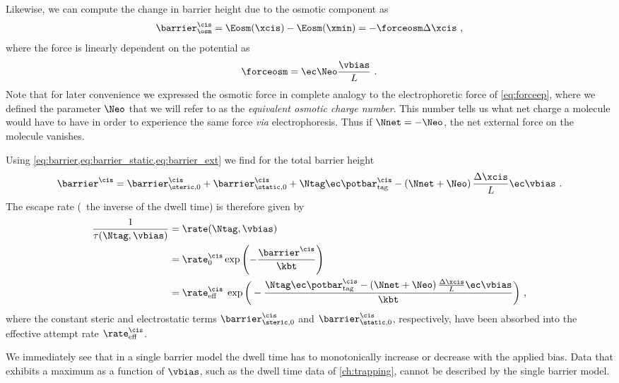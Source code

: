 Likewise, we can compute the change in barrier height due to the osmotic component as
%
\begin{align*}
    \barrier^\cis_{\osm} = \Eosm(\xcis) - \Eosm(\xmin)
    = - \forceosm \Delta \xcis
    \text{ ,}
\end{align*}
%
where the force is linearly dependent on the potential as
%
\begin{align}\label{eq:osmoticforce}
    \forceosm = \ec \Neo \frac{\vbias}{L}
    \text{ .}
\end{align}
%
Note that for later convenience we expressed the osmotic force in complete analogy to the electrophoretic
force of \cref{eq:forceep}, where we defined the parameter $\Neo$ that we will refer to as the
\emph{equivalent osmotic charge number}. This number tells us what net charge a molecule would have to have in
order to experience the same force \textit{via} electrophoresis. Thus if $\Nnet = -\Neo$, the net external
force on the molecule vanishes.

Using \cref{eq:barrier,eq:barrier_static,eq:barrier_ext} we find for the total barrier height
%
\begin{align}\label{eq:cisbarrier}
    \barrier^\cis = \barrier^{\cis}_{\steric,0} + \barrier^{\cis}_{\static,0}
        + \Ntag \ec  \potbar_{\rm{tag}}^\cis
        - \left(\Nnet + \Neo\right) \frac{\Delta \xcis}{L}\ec \vbias
    \text{ .}
\end{align}
%
The escape rate (\ie~the inverse of the dwell time) is therefore given by
%
\begin{align}\label{eq:single_barrier_dwell_time}
\begin{split}
    \frac{1}{\tau(\Ntag, \vbias)} ={}& \rate (\Ntag, \vbias)\\
    ={}& \rate^{\cis}_0 \exp\left(-\frac{\barrier^\cis}{\kbt}\right)\\
    ={}& \rate^{\cis}_{\rm{eff}}\; \exp\bigg(
        - \frac{\Ntag \ec  \potbar_{\rm{tag}}^\cis
        - \left(\Nnet + \Neo\right) \frac{\Delta \xcis}{L}\ec \vbias}{\kbt}
    \bigg)
    \text{ ,}
\end{split}
\end{align}
%
where the constant steric and electrostatic terms $\barrier^{\cis}_{\steric,0}$ and
$\barrier^{\cis}_{\static,0}$, respectively, have been absorbed into the effective attempt rate
$\rate^{\cis}_{\rm{eff}}$.

We immediately see that in a single barrier model the dwell time has to monotonically increase or decrease
with the applied bias.  Data that exhibits a maximum as a function of $\vbias$, such as the dwell time data of
\cref{ch:trapping}, cannot be described by the single barrier model.


